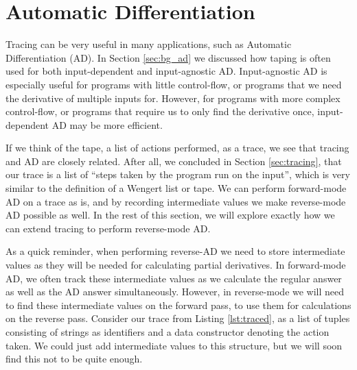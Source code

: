 \section{Automatic Differentiation} \label{sec:ad}
    Tracing can be very useful in many applications, such as Automatic Differentiation (AD).
    In Section \ref{sec:bg_ad} we discussed how taping is often used for both input-dependent and input-agnostic AD.
    Input-agnostic AD is especially useful for programs with little control-flow, or programs that we need the derivative of multiple inputs for.
    However, for programs with more complex control-flow, or programs that require us to only find the derivative once, input-dependent AD may be more efficient.

    If we think of the tape, a list of actions performed, as a trace, we see that tracing and AD are closely related.
    After all, we concluded in Section \ref{sec:tracing}, that our trace is a list of ``steps taken by the program run on the input'', which is very similar to the definition of a Wengert list or tape.
    We can perform forward-mode AD on a trace as is, and by recording intermediate values we make reverse-mode AD possible as well.
    In the rest of this section, we will explore exactly how we can extend tracing to perform reverse-mode AD.

    As a quick reminder, when performing reverse-AD we need to store intermediate values as they will be needed for calculating partial derivatives.
    In forward-mode AD, we often track these intermediate values as we calculate the regular answer as well as the AD answer simultaneously.
    However, in reverse-mode we will need to find these intermediate values on the forward pass, to use them for calculations on the reverse pass.
    Consider our trace from Listing \ref{lst:traced}, as a list of tuples consisting of strings as identifiers and a data constructor denoting the action taken.
    We could just add intermediate values to this structure, but we will soon find this not to be quite enough.
    
